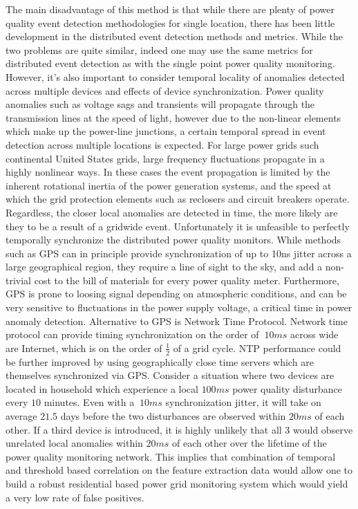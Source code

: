 The main disadvantage of this method is that while there are plenty of power quality event detection methodologies for single location, there has been little development in the distributed event detection methods and metrics. While the two problems are quite similar, indeed one may use the same metrics for distributed event detection as with the single point power quality monitoring. However, it's also important to consider temporal locality of anomalies detected across multiple devices and effects of device synchronization. Power quality anomalies such as voltage sags and transients will propagate through the transmission lines at the speed of light, however due to the non-linear elements which make up the power-line junctions, a certain temporal spread in event detection across multiple locations is expected. For large power grids such continental United States grids, large frequency fluctuations propagate in a highly nonlinear ways. In these cases the event propagation is limited by the inherent rotational inertia of the power generation systems, and the speed at which the grid protection elements such as reclosers and circuit breakers operate. Regardless, the closer local anomalies are detected in time, the more likely are they to be a result of a gridwide event. Unfortunately it is unfeasible to perfectly temporally synchronize the distributed power quality monitors. While methods such as GPS can in principle provide synchronization of up to 10ns jitter across a large geographical region, they require a line of sight to the sky, and add a non-trivial cost to the bill of materials for every power quality meter. Furthermore, GPS is prone to loosing signal depending on atmospheric conditions, and can be very sensitive to fluctuations in the power supply voltage, a critical time in power anomaly detection. Alternative to GPS is Network Time Protocol. Network time protocol can provide timing synchronization on the order of $~10ms$ across wide are Internet, which is on the order of $\frac{1}{2}$ of a grid cycle. NTP performance could be further improved by using geographically close time servers which are themselves synchronized via GPS. Consider a situation where two devices are located in household which experience a local $100ms$ power quality disturbance every $10$ minutes. Even with a $~10ms$ synchronization jitter, it will take on average $21.5$ days before the two disturbances are observed within $20ms$ of each other. If a third device is introduced, it is highly unlikely that all 3 would observe unrelated local anomalies within $20ms$ of each other over the lifetime of the power quality monitoring network. This implies that combination of temporal and threshold based correlation on the feature extraction data would allow one to build a robust residential based power grid monitoring system which would yield a very low rate of false positives. 

